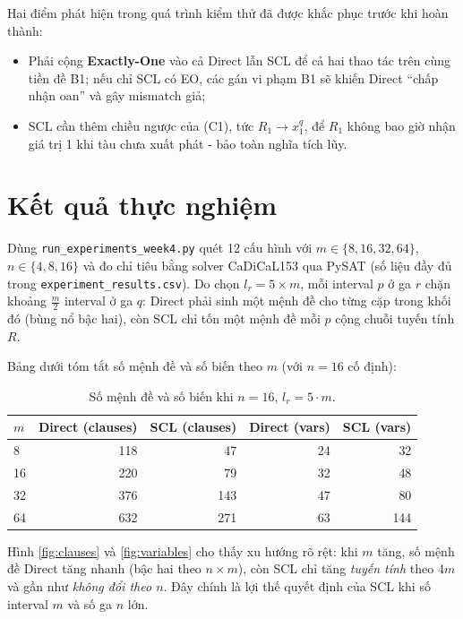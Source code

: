 \documentclass[12pt, a4paper]{article}
\begin{document}
Hai điểm phát hiện trong quá trình kiểm thử đã được khắc phục trước khi hoàn thành:
\begin{itemize}
    \item Phải cộng \textbf{Exactly-One} vào cả Direct lẫn SCL để cả hai thao tác trên cùng tiền đề B1; nếu chỉ SCL có EO, các gán vi phạm B1 sẽ khiến Direct ``chấp nhận oan'' và gây mismatch giả;
    \item SCL cần thêm chiều ngược của (C1), tức $R_1 \rightarrow x^q_1$, để $R_1$ không bao giờ nhận giá trị 1 khi tàu chưa xuất phát - bảo toàn nghĩa tích lũy.
\end{itemize}

\section{Kết quả thực nghiệm}
Dùng \texttt{run\_experiments\_week4.py} quét 12 cấu hình với $m \in \{8,16,32,64\}$, $n \in \{4,8,16\}$ và đo chỉ tiêu bằng solver CaDiCaL153 qua PySAT (số liệu đầy đủ trong \texttt{experiment\_results.csv}). Do chọn $l_r = 5 \times m$, mỗi interval $p$ ở ga $r$ chặn khoảng $\frac{m}{2}$ interval ở ga $q$: Direct phải sinh một mệnh đề cho từng cặp trong khối đó (bùng nổ bậc hai), còn SCL chỉ tốn một mệnh đề mỗi $p$ cộng chuỗi tuyến tính $R$.

Bảng dưới tóm tắt số mệnh đề và số biến theo $m$ (với $n = 16$ cố định):
\begin{table}[htbp]
    \centering
    \small
    \caption{Số mệnh đề và số biến khi $n = 16$, $l_r = 5 \cdot m$.}
    \label{tab:clauses}
    \begin{tabular}{lrrrr}
        \toprule
        $m$ & Direct (clauses) & SCL (clauses) & Direct (vars) & SCL (vars)\\
        \midrule
        8  & 118 & 47  & 24 & 32\\
        16 & 220 & 79  & 32 & 48\\
        32 & 376 & 143 & 47 & 80\\
        64 & 632 & 271 & 63 & 144\\
        \bottomrule
    \end{tabular}
\end{table}

Hình \ref{fig:clauses} và \ref{fig:variables} cho thấy xu hướng rõ rệt: khi $m$ tăng, số mệnh đề Direct tăng nhanh (bậc hai theo $n \times m$), còn SCL chỉ tăng \emph{tuyến tính} theo $4m$ và gần như \emph{không đổi theo $n$}. Đây chính là lợi thế quyết định của SCL khi số interval $m$ và số ga $n$ lớn.
\end{document}
